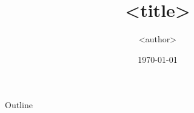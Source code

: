 \documentclass[10pt]{beamer}
\title[<short title>]{\textbf{<title>}}
\author[<author>]{<author>}
\institute{<affiliation>}
\date{\today}
\begin{document}
\begin{frame}
  \titlepage
\end{frame}

\begin{frame}{Outline}
  \tableofcontents
\end{frame}


\end{document}
